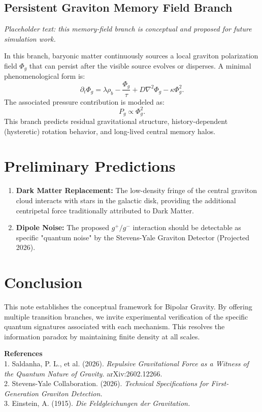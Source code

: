 \documentclass[11pt]{article}
\begin{document}
\subsection{Persistent Graviton Memory Field Branch}
\textit{Placeholder text: this memory-field branch is conceptual and proposed for future simulation work.}

In this branch, baryonic matter continuously sources a local graviton polarization field $\Phi_g$ that can persist after the visible source evolves or disperses. A minimal phenomenological form is:
\[
\partial_t \Phi_g = \lambda \rho_b - \frac{\Phi_g}{\tau} + D\nabla^2\Phi_g - \kappa \Phi_g^2.
\]
The associated pressure contribution is modeled as:
\[
P_g \propto \Phi_g^2.
\]
This branch predicts residual gravitational structure, history-dependent (hysteretic) rotation behavior, and long-lived central memory halos.

\section{Preliminary Predictions}
\begin{enumerate}
    \item \textbf{Dark Matter Replacement:} The low-density fringe of the central graviton cloud interacts with stars in the galactic disk, providing the additional centripetal force traditionally attributed to Dark Matter.
    \item \textbf{Dipole Noise:} The proposed $g^+/g^-$ interaction should be detectable as specific "quantum noise" by the Stevens-Yale Graviton Detector (Projected 2026).
\end{enumerate}

\section{Conclusion}
This note establishes the conceptual framework for Bipolar Gravity. By offering multiple transition branches, we invite experimental verification of the specific quantum signatures associated with each mechanism. This resolves the information paradox by maintaining finite density at all scales.

\vspace{1cm}
\noindent \textbf{References} \\
\small{
1. Saldanha, P. L., et al. (2026). \textit{Repulsive Gravitational Force as a Witness of the Quantum Nature of Gravity.} arXiv:2602.12266. \\
2. Stevens-Yale Collaboration. (2026). \textit{Technical Specifications for First-Generation Graviton Detection.} \\
3. Einstein, A. (1915). \textit{Die Feldgleichungen der Gravitation.}
}
\end{document}
